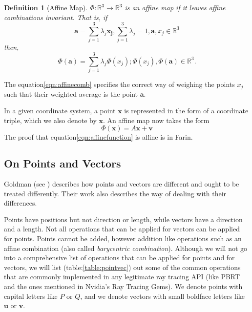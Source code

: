 \documentclass[a4paper, 12pt]{article}
\newtheorem{definition}{Definition}
\begin{document}
\begin{definition}[Affine Map]
	$\Phi:\mathbb{R}^{3}\to \mathbb{R}^{3}$ is an affine map if it leaves affine combinations
	invariant. That is, if
	$$
		\bm{a} = \sum_{j=1}^{3}\lambda_{j}\bm{x_{j}}, \sum_{j=1}^{3}\lambda_{j}=1, \bm{a}, x_{j}\in \mathbb{R}^{3}
	$$
	then, 
	\begin{equation}\label{eqn:affinecomb}
		\Phi(\bm{a}) = \sum_{j=1}^{3}\lambda_{j}\Phi(x_{j}); \Phi(x_{j}), \Phi(\bm{a}) \in \mathbb{R}^{3}.
	\end{equation}
\end{definition}

The  equation\eqref{eqn:affinecomb} specifies the correct way of weighing the 
points $x_{j}$ such that their weighted average is the point $\bm{a}$.

In a given coordinate system, a point $\bm{x}$ is represented in the form of a coordinate triple, 
which we also denote by $\bm{x}$. An affine map now takes the form 
\begin{equation}\label{eqn:affinefunction}
\Phi(\bm{x}) = A\bm{x} + \bm{v}
\end{equation}
The proof that equation\eqref{eqn:affinefunction} is affine is in Farin\cite{farin}.

\subsection{On Points and Vectors}
Goldman (see \cite{Goldman1985IllicitEI}) describes how points and vectors 
are different and ought to be treated differently. Their work also describes 
the way of dealing with their differences.

Points have positions but not direction or length, while vectors have a direction 
and a length. Not all operations that can be applied for vectors can be applied for 
points. Points cannot be added, however addition like operations 
such as an affine combination (also called \textit{barycentric combination}). Although 
we will not go into a comprehensive list of operations that can be 
applied for points and for vectors, we will list (table:\ref{table:pointvec}) out some of the common
operations that are commonly implemented in any legitimate ray tracing API 
(like PBRT\cite{pbrt} and the ones mentioned in Nvidia's Ray Tracing Gems\cite{Haines2019}). 
We denote points with capital letters like $P$ or $Q$, and we denote vectors 
with small boldface letters like $\bm{u}$ or $\bm{v}$.
\end{document}
